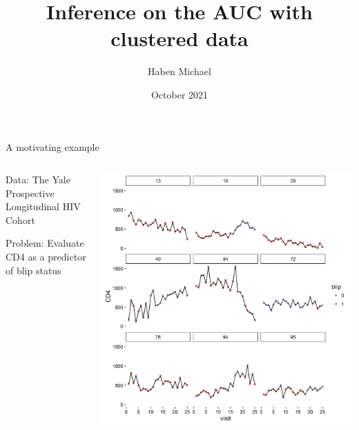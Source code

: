 \documentclass{beamer}
\title{Inference on the AUC with clustered data}
\author{Haben Michael}
\date{October 2021}
\begin{document}
\begin{frame}
  \titlepage
\end{frame}





\begin{frame}
  \centering
  A motivating example
  \medskip
  \begin{columns}
    \begin{column}{.3\textwidth}
      Data: The Yale Prospective Longitudinal HIV Cohort
      \vspace{.2in}
      
      Problem: Evaluate CD4 as a predictor of blip status
    \end{column}
    \begin{column}{.7\textwidth}
      \includegraphics[width=\textwidth]{fig5.png}
    \end{column}
  \end{columns}
  
\end{frame}
\end{document}
